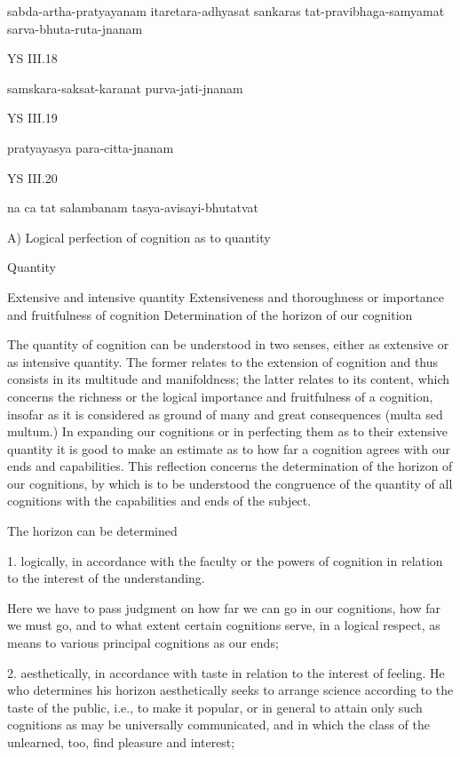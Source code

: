     sabda-artha-pratyayanam itaretara-adhyasat sankaras tat-pravibhaga-samyamat sarva-bhuta-ruta-jnanam

YS III.18

    samskara-saksat-karanat purva-jati-jnanam

YS III.19

    pratyayasya para-citta-jnanam

YS III.20

    na ca tat salambanam tasya-avisayi-bhutatvat

A) Logical perfection of cognition as to quantity

Quantity

    Extensive and intensive quantity
    Extensiveness and thoroughness or importance and fruitfulness of cognition
    Determination of the horizon of our cognition

The quantity of cognition can be understood in two senses,
either as extensive or as intensive quantity.
The former relates to the extension of cognition and
thus consists in its multitude and manifoldness;
the latter relates to its content, which concerns the richness
or the logical importance and fruitfulness of a cognition,
insofar as it is considered as ground of many and great consequences (multa sed multum.)
In expanding our cognitions or in perfecting them as to their extensive quantity
it is good to make an estimate as to how far a cognition agrees with our ends and capabilities.
This reflection concerns the determination of the horizon of our cognitions,
by which is to be understood the congruence of the quantity of all cognitions
with the capabilities and ends of the subject.

The horizon can be determined

1. logically, in accordance with the faculty or the powers of cognition
in relation to the interest of the understanding.

Here we have to pass judgment on how far we can go in our cognitions,
how far we must go, and to what extent certain cognitions serve,
in a logical respect, as means to various principal cognitions as our ends;

2. aesthetically, in accordance with taste in relation to the interest of feeling.
He who determines his horizon aesthetically seeks to arrange science according
to the taste of the public, i.e., to make it popular, or in general to attain only
such cognitions as may be universally communicated, and in which the class
of the unlearned, too, find pleasure and interest;

